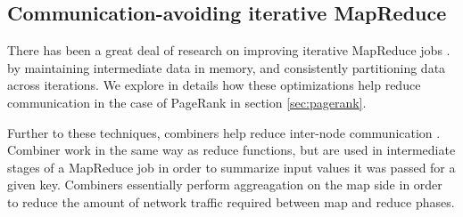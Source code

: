 \subsection{Communication-avoiding iterative MapReduce}

There has been a great deal of research on improving iterative MapReduce jobs \cite{haloop, twister, rdd}. by maintaining intermediate data in memory, and consistently partitioning data across iterations. We explore in details how these optimizations help reduce communication in the case of PageRank in section \ref{sec:pagerank}.

Further to these techniques, combiners help reduce inter-node communication \cite{hop}. Combiner work in the same way as reduce functions, but are used in intermediate stages of a MapReduce job in order to summarize input values it was passed for a given key. Combiners essentially perform aggreagation on the map side in order to reduce the amount of network traffic required between map and reduce phases.  
